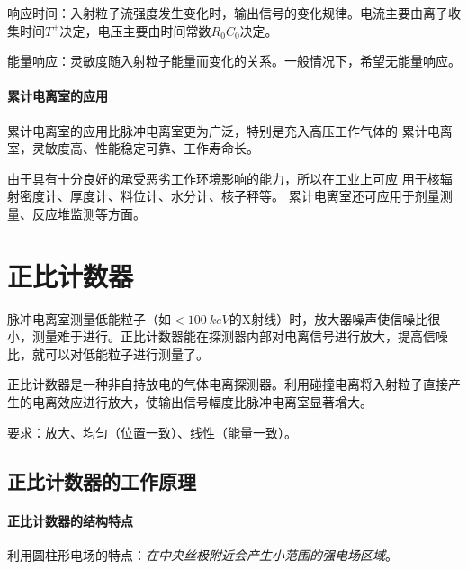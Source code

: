 响应时间：入射粒子流强度发生变化时，输出信号的变化规律。电流主要由离子收集时间$T^+$决定，电压主要由时间常数$R_0C_0$决定。

能量响应：灵敏度随入射粒子能量而变化的关系。一般情况下，希望无能量响应。
\paragraph{累计电离室的应用}
累计电离室的应用比脉冲电离室更为广泛，特别是充入高压工作气体的
累计电离室，灵敏度高、性能稳定可靠、工作寿命长。

由于具有十分良好的承受恶劣工作环境影响的能力，所以在工业上可应
用于核辐射密度计、厚度计、料位计、水分计、核子秤等。
累计电离室还可应用于剂量测量、反应堆监测等方面。

\section{正比计数器}

脉冲电离室测量低能粒子（如$< \qty{100}{keV}$的X射线）时，放大器噪声使信噪比很小，测量难于进行。正比计数器能在探测器内部对电离信号进行放大，提高信噪比，就可以对低能粒子进行测量了。

正比计数器是一种非自持放电的气体电离探测器。利用碰撞电离将入射粒子直接产生的电离效应进行放大，使输出信号幅度比脉冲电离室显著增大。

要求：放大、均匀（位置一致）、线性（能量一致）。

\subsection{正比计数器的工作原理}

\paragraph{正比计数器的结构特点}
利用圆柱形电场的特点：\textit{在中央丝极附近会产生小范围的强电场区域}。

